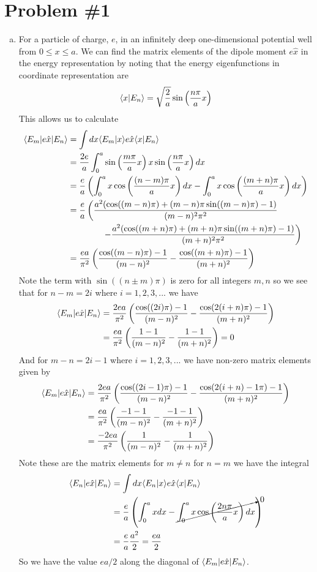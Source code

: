 \documentclass[11pt]{article}
\numberwithin{equation}{section}
\begin{document}


\section{Problem \#1}
\begin{enumerate}[(a)]
\item For a particle of charge, $e$, in an infinitely deep one-dimensional potential well 
from $0\le{x}\le{a}$. We can find the matrix elements of the dipole moment $e\hat{x}$ in the
energy representation by noting that the energy eigenfunctions in coordinate representation
are
$$\langle{x}|{E_n}\rangle = \sqrt{\frac{2}{a}}\sin\left(\frac{n\pi}{a}x\right)$$
This allows us to calculate
\begin{align*}
\langle{E_m}|e\hat{x}|{E_n}\rangle &= \int{dx}\langle{E_m}|{x}\rangle e\hat{x}\langle{x}|{E_n}\rangle\\
&= \frac{2e}{a}\int_{0}^{a}\sin\left(\frac{m\pi}{a}x\right)x\sin\left(\frac{n\pi}{a}x\right)dx\\
&= \frac{e}{a}\left(\int_{0}^{a}x\cos\left(\frac{(n-m)\pi}{a}x\right)dx- \int_{0}^{a}x\cos\left(\frac{(m+n)\pi}{a}x\right)dx\right)\\
&= \frac{e}{a}\left(\frac{a^2(\cos((m-n)\pi)+(m-n)\pi\sin((m-n)\pi)-1)}{(m-n)^2\pi^2}\right.\\
&\qquad\qquad \left.- \frac{a^2(\cos((m+n)\pi)+(m+n)\pi\sin((m+n)\pi)-1)}{(m+n)^2\pi^2}\right)\\
&= \frac{ea}{\pi^2}\left(\frac{\cos((m-n)\pi)-1}{(m-n)^2} - \frac{\cos((m+n)\pi)-1}{(m+n)^2}\right)
\end{align*}
Note the term with $\sin((n\pm{m})\pi)$ is zero for all integers $m,n$ so we see that for 
$n-m=2i$ where $i=1,2,3,...$ we have 
\begin{align*}
\langle{E_m}|e\hat{x}|{E_n}\rangle &= \frac{2ea}{\pi^2}\left(\frac{\cos((2i)\pi)-1}{(m-n)^2} - \frac{\cos(2(i+n)\pi)-1}{(m+n)^2}\right)\\
&= \frac{ea}{\pi^2}\left(\frac{1-1}{(m-n)^2} - \frac{1-1}{(m+n)^2}\right) = 0
\end{align*} 
And for $m-n=2i-1$ where $i=1,2,3,...$ we have non-zero matrix elements given by
\begin{align*}
\langle{E_m}|e\hat{x}|{E_n}\rangle &= \frac{2ea}{\pi^2}\left(\frac{\cos((2i-1)\pi)-1}{(m-n)^2} - \frac{\cos(2(i+n)-1\pi)-1}{(m+n)^2}\right)\\
&= \frac{ea}{\pi^2}\left(\frac{-1-1}{(m-n)^2} - \frac{-1-1}{(m+n)^2}\right)\\
&= \frac{-2ea}{\pi^2}\left(\frac{1}{(m-n)^2} - \frac{1}{(m+n)^2}\right)
\end{align*} 
Note these are the matrix elements for $m\ne{n}$ for $n=m$ we have the integral
\begin{align*}
\langle{E_n}|e\hat{x}|{E_n}\rangle &= \int{dx}\langle{E_n}|{x}\rangle e\hat{x}\langle{x}|{E_n}\rangle\\
&= \frac{e}{a}\left(\int_{0}^{a}xdx- \cancelto{0}{\int_{0}^{a}x\cos\left(\frac{2n\pi}{a}x\right)dx}\right)\\
&= \frac{e}{a}\frac{a^2}{2} = \frac{ea}{2}
\end{align*}
So we have the value $ea/2$ along the diagonal of $\langle{E_m}|e\hat{x}|{E_n}\rangle$.


\end{enumerate}
\end{document}
